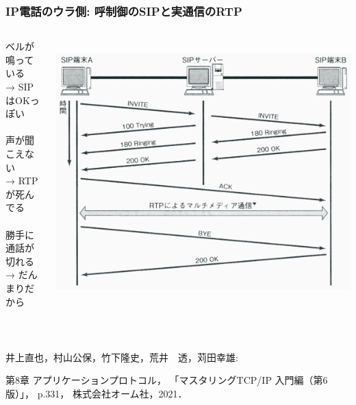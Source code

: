 \documentclass[
  lualatex,
  aspectratio=169,
  14pt
]{beamer}
\begin{document}
\begin{frame}
  \frametitle{IP電話のウラ側: 呼制御のSIPと実通信のRTP}

  \begin{columns}
    \begin{column}{.35\textwidth}
      ベルが鳴っている\\
      \hspace{1\zw}→ SIPはOKっぽい
      \\~\\[-.5\baselineskip]

      声が聞こえない\\
      \hspace{1\zw}→ RTPが死んでる
      \\~\\[-.5\baselineskip]

      勝手に通話が切れる\\
      \hspace{1\zw}→ だんまりだから
    \end{column}
    \begin{column}{.65\textwidth}
      \raggedleft
      ~\\[.2\baselineskip]
      \includegraphics[height=.9\textheight]{./images/sip.png}
    \end{column}
  \end{columns}

  ~\\[-.9\baselineskip]
  {\tiny\raggedright
  井上直也，村山公保，竹下隆史，荒井　透，苅田幸雄:\\[-1.5\baselineskip]
  \raggedright
  第8章 アプリケーションプロトコル，
  「マスタリングTCP/IP 入門編（第6版）」，
  p.331，
  株式会社オーム社，2021．}
  \\~\\[3\baselineskip]

  \note{ }
\end{frame}
\end{document}
